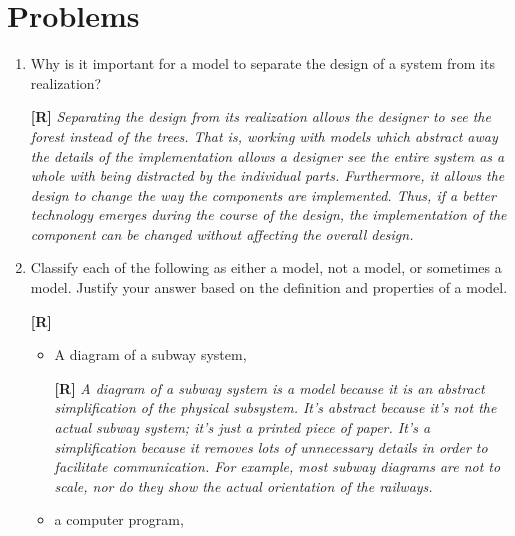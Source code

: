 \section{Problems}
\label{section:behavModelsProblems}

\begin{enumerate}
\def\labelenumi{\arabic{enumi}.}
\item
  Why is it important for a model to separate the design of a system
  from its realization?

  \begin{onlysolution}
    \textbf{[R]}
    \itshape
    Separating the design from its realization allows the designer to see the 
    forest instead of the trees. That is, working with models which abstract away 
    the details of the implementation allows a designer see the entire system as a 
    whole with being distracted by the individual parts. Furthermore, it allows the 
    design to change the way the components are implemented. Thus, if a better 
    technology emerges during the course of the design, the implementation of the 
    component can be changed without affecting the overall design.
  \end{onlysolution}
\item
  Classify each of the following as either a model, not a model, or
  sometimes a model. Justify your answer based on the definition and
  properties of a model.

  \begin{onlysolution}
    \textbf{[R]}
    \itshape
  \end{onlysolution}

\begin{itemize}
  \def\labelenumi{\alph{enumi})}
  \item A diagram of a subway system,

    \begin{onlysolution}
      \textbf{[R]}
      \itshape
      A diagram of a subway system is a model because it is an abstract 
      simplification of the physical subsystem. It’s abstract because it’s 
      not the actual subway system; it’s just a printed piece of paper. It’s 
      a simplification because it removes lots of unnecessary details in 
      order to facilitate communication. For example, most subway diagrams are 
      not to scale, nor do they show the actual orientation of the railways.
    \end{onlysolution}

  \item a computer program, 


\end{itemize}
\end{enumerate}
